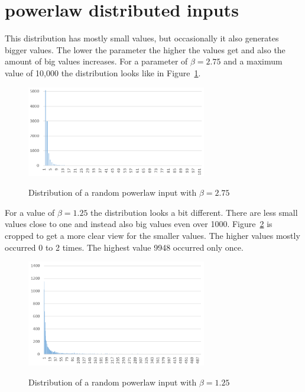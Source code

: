 \section{powerlaw distributed inputs}
This distribution has mostly small values, but occasionally it also generates bigger values.
The lower the parameter the higher the values get and also the amount of big values increases.
For a parameter of $\beta=2.75$ and a maximum value of 10,000 the distribution looks like in Figure~\ref{fig:powerDistExample1}.

\begin{figure}[h]
      \caption{Distribution of a random powerlaw input with $\beta=2.75$}
      \centering
      \includegraphics[width=0.7\textwidth]{figures/images/numberGenerator/powerlaw_-2_75.png}\label{fig:powerDistExample1}
\end{figure}

For a value of $\beta=1.25$ the distribution looks a bit different.
There are less small values close to one and instead also big values even over 1000.
Figure~\ref{fig:powerDistExample2} is cropped to get a more clear view for the smaller values.
The higher values mostly occurred 0 to 2 times.
The highest value 9948 occurred only once.

\begin{figure}[h]
      \caption{Distribution of a random powerlaw input with $\beta=1.25$}
      \centering
      \includegraphics[width=0.7\textwidth]{figures/images/numberGenerator/powerlaw_-1_25.png}\label{fig:powerDistExample2}
\end{figure}
